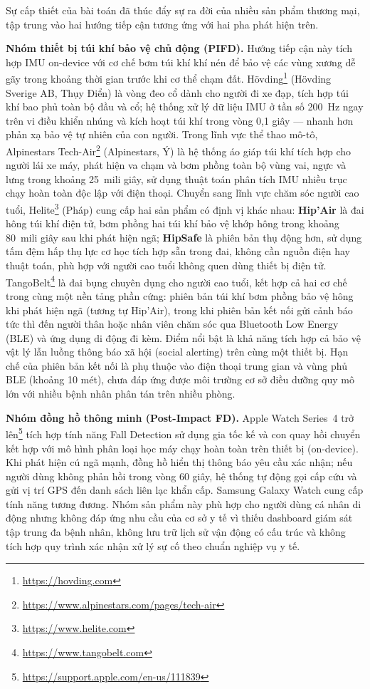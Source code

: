 \documentclass[../DoAn.tex]{subfiles}
\begin{document}
Sự cấp thiết của bài toán đã thúc đẩy sự ra đời của nhiều sản phẩm thương mại, tập trung vào hai hướng tiếp cận tương ứng với hai pha phát hiện trên.

\textbf{Nhóm thiết bị túi khí bảo vệ chủ động (PIFD).} Hướng tiếp cận này tích hợp IMU on-device với cơ chế bơm túi khí khí nén để bảo vệ các vùng xương dễ gãy trong khoảng thời gian trước khi cơ thể chạm đất. Hövding\footnote{\url{https://hovding.com}} (Hövding Sverige AB, Thụy Điển) là vòng đeo cổ dành cho người đi xe đạp, tích hợp túi khí bao phủ toàn bộ đầu và cổ; hệ thống xử lý dữ liệu IMU ở tần số 200~Hz ngay trên vi điều khiển nhúng và kích hoạt túi khí trong vòng 0,1 giây --- nhanh hơn phản xạ bảo vệ tự nhiên của con người. Trong lĩnh vực thể thao mô-tô, Alpinestars Tech-Air\footnote{\url{https://www.alpinestars.com/pages/tech-air}} (Alpinestars, Ý) là hệ thống áo giáp túi khí tích hợp cho người lái xe máy, phát hiện va chạm và bơm phồng toàn bộ vùng vai, ngực và lưng trong khoảng 25~mili giây, sử dụng thuật toán phân tích IMU nhiều trục chạy hoàn toàn độc lập với điện thoại. Chuyển sang lĩnh vực chăm sóc người cao tuổi, Helite\footnote{\url{https://www.helite.com}} (Pháp) cung cấp hai sản phẩm có định vị khác nhau: \textbf{Hip'Air} là đai hông túi khí điện tử, bơm phồng hai túi khí bảo vệ khớp hông trong khoảng 80~mili giây sau khi phát hiện ngã; \textbf{HipSafe} là phiên bản thụ động hơn, sử dụng tấm đệm hấp thụ lực cơ học tích hợp sẵn trong đai, không cần nguồn điện hay thuật toán, phù hợp với người cao tuổi không quen dùng thiết bị điện tử. TangoBelt\footnote{\url{https://www.tangobelt.com}} là đai bụng chuyên dụng cho người cao tuổi, kết hợp cả hai cơ chế trong cùng một nền tảng phần cứng: phiên bản túi khí bơm phồng bảo vệ hông khi phát hiện ngã (tương tự Hip'Air), trong khi phiên bản kết nối gửi cảnh báo tức thì đến người thân hoặc nhân viên chăm sóc qua Bluetooth Low Energy (BLE) và ứng dụng di động đi kèm. Điểm nổi bật là khả năng tích hợp cả bảo vệ vật lý lẫn luồng thông báo xã hội (social alerting) trên cùng một thiết bị. Hạn chế của phiên bản kết nối là phụ thuộc vào điện thoại trung gian và vùng phủ BLE (khoảng 10 mét), chưa đáp ứng được môi trường cơ sở điều dưỡng quy mô lớn với nhiều bệnh nhân phân tán trên nhiều phòng.

\textbf{Nhóm đồng hồ thông minh (Post-Impact FD).} Apple Watch Series~4 trở lên\footnote{\url{https://support.apple.com/en-us/111839}} tích hợp tính năng Fall Detection sử dụng gia tốc kế và con quay hồi chuyển kết hợp với mô hình phân loại học máy chạy hoàn toàn trên thiết bị (on-device). Khi phát hiện cú ngã mạnh, đồng hồ hiển thị thông báo yêu cầu xác nhận; nếu người dùng không phản hồi trong vòng 60 giây, hệ thống tự động gọi cấp cứu và gửi vị trí GPS đến danh sách liên lạc khẩn cấp. Samsung Galaxy Watch cung cấp tính năng tương đương. Nhóm sản phẩm này phù hợp cho người dùng cá nhân di động nhưng không đáp ứng nhu cầu của cơ sở y tế vì thiếu dashboard giám sát tập trung đa bệnh nhân, không lưu trữ lịch sử vận động có cấu trúc và không tích hợp quy trình xác nhận xử lý sự cố theo chuẩn nghiệp vụ y tế.
\end{document}
